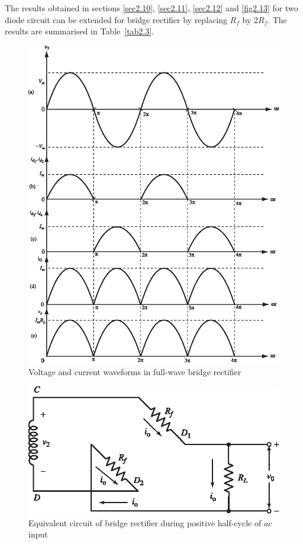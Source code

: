 \begin{solution}
The results obtained in sections \ref{sec2.10}, \ref{sec2.11}, \ref{sec2.12} and \ref{fig2.13} for two diode
circuit can be extended for bridge rectifier by replacing $R_f$ by $2
R_f$. The results are summarised in Table~\ref{tab2.3}.
\begin{figure}[H]
\centering
\includegraphics{chap2/add-fig/S3-EE-02-009.eps}
\caption{Voltage and current waveforms in full-wave bridge rectifier}\label{fig2.9}
\end{figure}

\begin{figure}[H]
\centering
\includegraphics{chap2/add-fig/S3-EE-02-010.eps}
\caption{Equivalent circuit of bridge rectifier during positive half-cycle of $ac$ input}\label{fig2.10}
\end{figure}


\end{solution}
